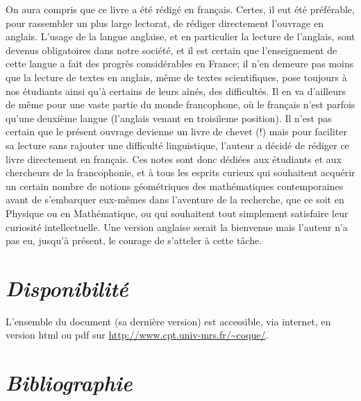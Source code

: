 On aura compris que ce livre a \'et\'e r\'edig\'e en fran\c cais. 
Certes, il eut \'et\'e pr\'ef\'erable, pour rassembler un plus large lectorat, de r\'ediger directement l'ouvrage en anglais.
L'usage de la langue anglaise, et en particulier la lecture de l'anglais, sont devenus obligatoires dans notre soci\'et\'e, et il est certain que l'enseignement de cette langue a fait des progr\`es consid\'erables en France; il n'en demeure pas moins que la lecture de textes en anglais, m\^eme de textes scientifiques, pose toujours \`a nos \'etudiants ainsi qu'\`a certains de leurs a\^in\'es, des difficult\'es.
Il en va d'ailleurs de m\^eme pour une vaste partie du monde francophone, o\`u le fran\c cais n'est parfois qu'une deuxi\`eme langue (l'anglais venant en troisi\`ieme position).
Il n'est pas certain que le pr\'esent ouvrage devienne un livre de chevet (!) mais pour faciliter sa lecture sans rajouter une difficult\'e linguistique, l'auteur a d\'ecid\'e de r\'ediger ce livre directement en fran\c cais. 
Ces notes sont donc  d\'edi\'ees aux \'etudiants et aux chercheurs de la francophonie, et \`a tous les esprits curieux qui souhaitent acqu\'erir un certain nombre de notions g\'eom\'etriques des math\'ematiques contemporaines avant de s'embarquer eux-m\^emes dans l'aventure de la recherche, que ce soit en Physique ou en Math\'ematique, ou qui souhaitent tout simplement satisfaire leur curiosit\'e intellectuelle.
Une version anglaise serait la bienvenue mais l'auteur n'a pas eu,  jusqu'\`a pr\'esent, le courage de s'atteler \`a cette t\^ache.


\section*{\sl Disponibilit\'e}

L'ensemble du document (sa derni\`ere version) est accessible,
via internet, en version html ou pdf sur \url{http://www.cpt.univ-mrs.fr/~coque/}.

\vfill
\eject

\section*{\sl Bibliographie}

